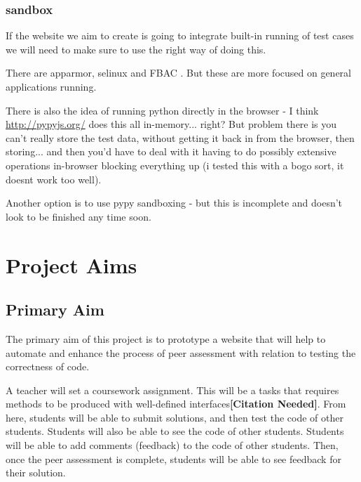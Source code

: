\documentclass[a4paper,11pt]{report}
\newcommand{\cn}{\textbf{[Citation Needed]}}
\begin{document}
\subsection{sandbox}
If the website we aim to create is going to integrate built-in running of test cases we will need to make sure to use the right way of doing this.\par
There are apparmor, selinux and FBAC \cite{schreuders_empowering_2011}. But these are more focused on general applications running.\par
There is also the idea of running python directly in the browser - I think \url{http://pypyjs.org/} does this all in-memory... right? But problem there is you can't really store the test data, without getting it back in from the browser, then storing... and then you'd have to deal with it having to do possibly extensive operations in-browser blocking everything up (i tested this with a bogo sort, it doesnt work too well).\par
Another option is to use pypy sandboxing - but this is incomplete and doesn't look to be finished any time soon.\par


\chapter{Project Aims}
\section{Primary Aim}
The primary aim of this project is to prototype a website that will help to automate and enhance the process of peer assessment with relation to testing the correctness of code.\par
A teacher will set a coursework assignment. This will be a tasks that requires methods to be produced with well-defined interfaces\cn. From here, students will be able to submit solutions, and then test the code of other students. Students will also be able to see the code of other students. Students will be able to add comments (feedback) to the code of other students. Then, once the peer assessment is complete, students will be able to see feedback for their solution.
\end{document}

